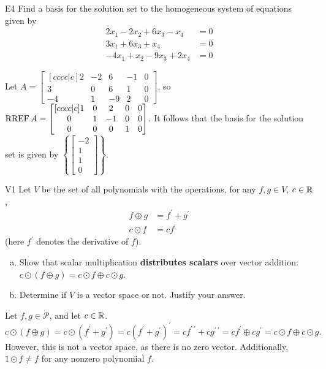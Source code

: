 \documentclass{sbgLAexam}
\begin{document}
\begin{problem}{E4}
Find a basis for the solution set to the homogeneous system of equations
given by
\begin{align*}
2x_1-2x_2+6x_3-x_4 &=0 \\
3x_1+6x_3+x_4 &=0 \\
-4x_1+x_2-9x_3+2x_4&=0
\end{align*}
\end{problem}
\begin{solution}
Let \(A =
  \begin{bmatrix}[cccc|c]
    2 & -2 & 6 & -1 & 0 \\
    3 & 0 & 6 & 1 & 0 \\
    -4 & 1 & -9 & 2 & 0
  \end{bmatrix}
\), so \(\operatorname{RREF} A =
  \begin{bmatrix}[cccc|c]
    1 & 0 & 2 & 0 & 0 \\
    0 & 1 & -1 & 0 & 0 \\
    0 & 0 & 0 & 1 & 0
  \end{bmatrix}
\).
It follows that the basis for the solution set is given by \(\left\{
  \begin{bmatrix}
    -2 \\
    1 \\
    1 \\
    0
  \end{bmatrix}
\right\}\).
\end{solution}
\begin{extract}\newpage\end{extract}
\begin{problem}{V1}
Let $V$ be the set of all polynomials with the operations, for any $f, g \in V$, $c \in \mathbb{R}$,
\begin{align*}
f \oplus g &= f^\prime + g^\prime \\
c \odot f &= c f^\prime
\end{align*}
(here $f^\prime$ denotes the derivative of $f$).
\begin{enumerate}[(a)]
\item Show that scalar multiplication \textbf{distributes scalars} over
      vector addition:
      \(c\odot(f \oplus g)=
      c\odot f \oplus c\odot g\).
\item Determine if $V$ is a vector space or not.  Justify your answer.
\end{enumerate}
\end{problem}
\begin{solution}
Let $f,g \in \mathcal{P}$, and let $c \in \mathbb{R}$.
$$c \odot (f \oplus g) = c \odot (f^\prime+g^\prime) =
c(f^\prime+g^\prime)^\prime = cf^{\prime\ \prime}+cg^{\prime\ \prime} =
cf^\prime\oplus cg^\prime= c \odot f \oplus c \odot g.$$
However, this is not a vector space, as there is no zero vector.  Additionally, $1 \odot f \neq f$ for any nonzero polynomial $f$.
\end{solution}
\end{document}

